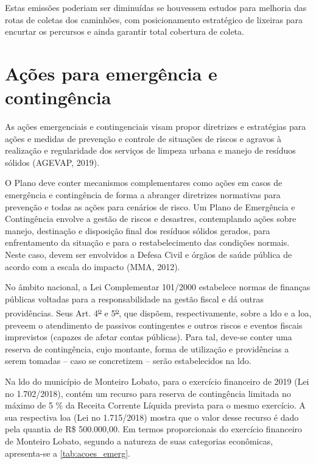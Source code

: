 Estas emissões poderiam ser diminuídas se houvessem estudos para melhoria das rotas de coletas dos caminhões, com posicionamento estratégico de lixeiras para encurtar os percursos e ainda garantir total cobertura de coleta. 

\section{Ações para emergência e contingência}
As ações emergenciais e contingenciais visam propor diretrizes e estratégias para ações e medidas de prevenção e controle de situações de riscos e agravos à realização e regularidade dos serviços de limpeza urbana e manejo de resíduos sólidos (AGEVAP, 2019).

O Plano deve conter mecanismos complementares como ações em casos de emergência e contingência de forma a abranger diretrizes normativas para prevenção e todas as ações para cenários de risco. Um Plano de Emergência e Contingência envolve a gestão de riscos e desastres, contemplando ações sobre manejo, destinação e disposição final dos resíduos sólidos gerados, para enfrentamento da situação e para o restabelecimento das condições normais. Neste caso, devem ser envolvidos a Defesa Civil e órgãos de saúde pública de acordo com a escala do impacto (MMA, 2012).

No âmbito nacional, a Lei Complementar 101/2000 estabelece normas de finanças públicas voltadas para a responsabilidade na gestão fiscal e dá outras providências. Seus Art. 4\textsuperscript{\underline{o}} e 5\textsuperscript{\underline{o}}, que dispõem, respectivamente, sobre a \gls{ldo} e a \gls{loa}, preveem o atendimento de passivos contingentes e outros riscos e eventos fiscais imprevistos (capazes de afetar contas públicas). Para tal, deve-se conter uma reserva de contingência, cujo montante, forma de utilização e providências a serem tomadas – caso se concretizem – serão estabelecidos na \gls{ldo}.
 
Na \gls{ldo} do município de Monteiro Lobato, para o exercício financeiro de 2019 (Lei no 1.702/2018), contém um recurso para reserva de contingência limitada no máximo de 5 \% da Receita Corrente Líquida prevista para o mesmo exercício. A sua respectiva \gls{loa} (Lei no 1.715/2018) mostra que o valor desse recurso é dado pela quantia de R\$ 500.000,00. Em termos proporcionais do exercício financeiro de Monteiro Lobato, segundo a natureza de suas categorias econômicas, apresenta-se a \autoref{tab:acoes_emerg}.

		
		
